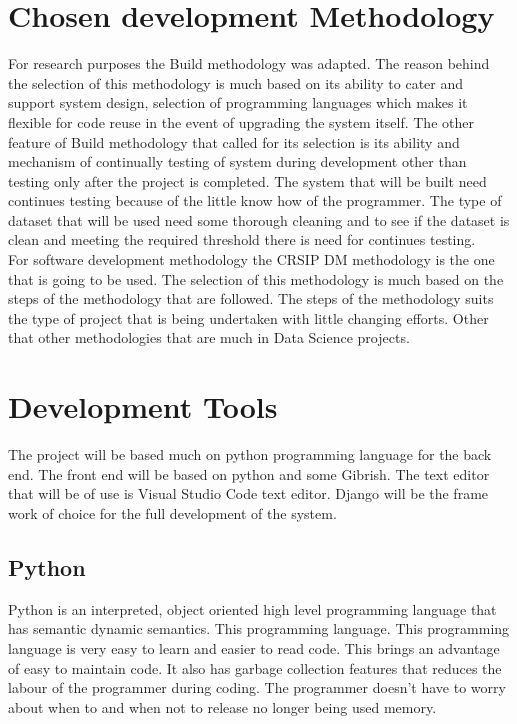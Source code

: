 \documentclass[12pt]{report}
\begin{document}
	
	\section{Chosen development Methodology}
	For research purposes the Build methodology was adapted. The reason behind the selection of this methodology is much based on its ability to cater and support system design, selection of programming languages which makes it flexible for code reuse in the event of upgrading the system itself. The other feature of Build methodology that called for its selection is its ability and mechanism of continually testing of system during development other than testing only after the project is completed. The system that will be built need continues testing because of the little know how of the programmer. The type of dataset that will be used need some thorough cleaning and to see if the dataset is clean and meeting the required threshold there is need for continues testing.\\
	
	For software development methodology the CRSIP DM methodology is the one that is going to be used. The selection of this methodology is much based on the steps of the methodology that are followed. The steps of the methodology suits the type of project that is being undertaken with little changing efforts. Other that other methodologies that are much in Data Science projects.\\
	
	\section{Development Tools}
	The project will be based much on python programming language for the back end. The front end will be based on python and some Gibrish. The text editor that will be of use is Visual Studio Code text editor. Django will be the frame work of choice for the full development of the system.\\
	
	\subsection{Python}
	Python is an interpreted, object oriented high level programming language that has semantic dynamic semantics. This programming language. This programming language is very easy to learn and easier to read code. This brings an advantage of easy to maintain code. It also has garbage collection features that reduces the labour of the programmer during coding. The programmer doesn't have to worry about when to and when not to release no longer being used memory.\\
	
\end{document}
